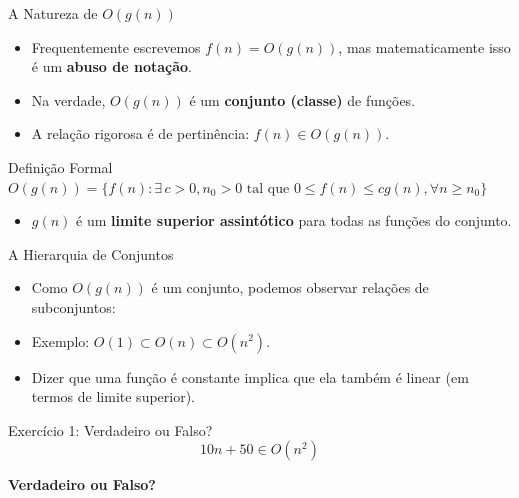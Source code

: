 \documentclass[aspectratio=169]{beamer}
\begin{document}
\begin{frame}{A Natureza de $O(g(n))$}
    \begin{itemize}
        \item Frequentemente escrevemos $f(n) = O(g(n))$, mas matematicamente isso é um \textbf{abuso de notação}.
        \item Na verdade, $O(g(n))$ é um \textbf{conjunto (classe)} de funções.
        \item A relação rigorosa é de pertinência: $f(n) \in O(g(n))$.
    \end{itemize}
    
    \begin{block}{Definição Formal}
        $O(g(n)) = \{ f(n) : \exists \, c > 0, n_0 > 0 \text{ tal que } 0 \le f(n) \le cg(n), \forall n \ge n_0 \}$
    \end{block}
    
    \begin{itemize}
        \item $g(n)$ é um \textbf{limite superior assintótico} para todas as funções do conjunto.
    \end{itemize}
\end{frame}

\begin{frame}{A Hierarquia de Conjuntos}
    \begin{itemize}
        \item Como $O(g(n))$ é um conjunto, podemos observar relações de subconjuntos:
    \end{itemize}

    \centering

    \begin{itemize}
        \item Exemplo: $O(1) \subset O(n) \subset O(n^2)$.
        \item Dizer que uma função é constante implica que ela também é linear (em termos de limite superior).
    \end{itemize}
\end{frame}



\begin{frame}{Exercício 1: Verdadeiro ou Falso?}
    \Large
    \[ 10n + 50 \in O(n^2) \]
    \begin{center}
        \textbf{Verdadeiro ou Falso?}
    \end{center}
\end{frame}
\end{document}
